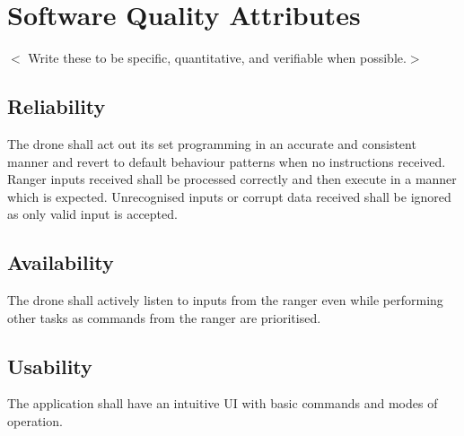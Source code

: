 \section{Software Quality Attributes}
$<$ Write these to be specific, quantitative, and verifiable when possible.$>$
\subsection {Reliability}
The drone shall act out its set programming in an accurate and consistent manner and revert to default behaviour patterns when no instructions received.  
\newline
Ranger inputs received shall be processed correctly and then execute in a manner which is expected. Unrecognised inputs or corrupt data received shall be ignored as only valid input is accepted.
\newline

\subsection {Availability}
The drone shall actively listen to inputs from the ranger even while performing other tasks as commands from the ranger are prioritised. 
\newline

\subsection {Usability}
The application shall have an intuitive UI with basic commands and modes of operation.
\newline

